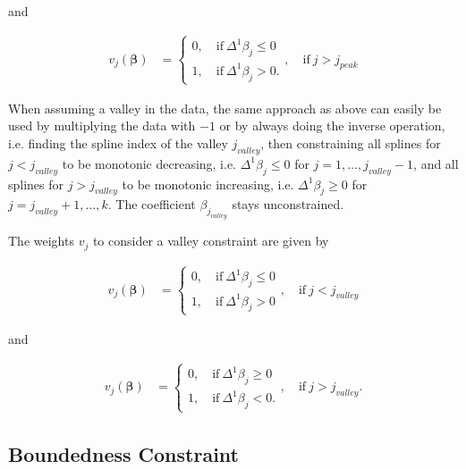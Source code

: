 \documentclass[10pt,a4paper]{article}
\begin{document}
	and 
	
	\begin{align}\label{eq:v_peak_2}
		v_j(\boldsymbol{\beta}) &= \begin{cases} 
								 		0, \quad \text{if} \ \Delta^1\beta_j \le 0 \\ 
								 		1, \quad \text{if} \ \Delta^1\beta_j > 0.
								  \end{cases}, \quad \text{if} \ j > j_{peak}
	\end{align}
	
	When assuming a valley in the data, the same approach as above can easily be used by multiplying the data with $-1$ or by always doing the inverse operation, i.e. finding the spline index of the valley $j_{valley}$, then constraining all splines for $j < j_{valley}$ to be monotonic decreasing, i.e. $\Delta^1 \beta_j \le 0$ for $j = 1, \dots, j_{valley}-1$, and all splines for $j > j_{valley}$ to be monotonic increasing, i.e. $\Delta^1 \beta_j \ge 0$ for $j = j_{valley}+1, \dots, k$. The coefficient $\beta_{j_{valley}}$ stays unconstrained. 
	
	The weights $v_j$ to consider a valley constraint are given by
	
	\begin{align}\label{eq:v_valley_1}
		v_j(\boldsymbol{\beta}) &= \begin{cases} 
										0, \quad \text{if} \ \Delta^1\beta_j \le 0 \\ 
										1, \quad \text{if} \ \Delta^1\beta_j > 0
								   \end{cases}, \quad \text{if} \ j < j_{valley}
	\end{align}
	
	and 
	
	\begin{align}\label{eq:v_valley_2}
		v_j(\boldsymbol{\beta}) &= \begin{cases} 
										0, \quad \text{if} \ \Delta^1\beta_j \ge 0 \\ 
										1, \quad \text{if} \ \Delta^1\beta_j < 0.
									\end{cases}, \quad \text{if} \ j > j_{valley}.
	\end{align}
	
	\subsection{Boundedness Constraint}
	
\end{document}
